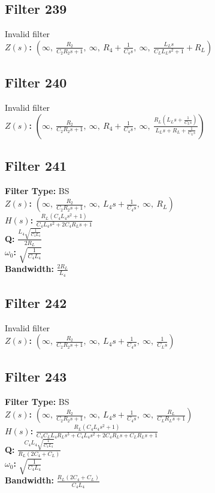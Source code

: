 \documentclass{article}
\begin{document}
\subsection*{Filter 239}
Invalid filter \\ 
\textbf{$Z(s)$:} $\left( \infty, \  \frac{R_{2}}{C_{2} R_{2} s + 1}, \  \infty, \  R_{4} + \frac{1}{C_{4} s}, \  \infty, \  \frac{L_{L} s}{C_{L} L_{L} s^{2} + 1} + R_{L}\right)$ \\ 
\subsection*{Filter 240}
Invalid filter \\ 
\textbf{$Z(s)$:} $\left( \infty, \  \frac{R_{2}}{C_{2} R_{2} s + 1}, \  \infty, \  R_{4} + \frac{1}{C_{4} s}, \  \infty, \  \frac{R_{L} \left(L_{L} s + \frac{1}{C_{L} s}\right)}{L_{L} s + R_{L} + \frac{1}{C_{L} s}}\right)$ \\ 
\subsection*{Filter 241}
\textbf{Filter Type:} BS \\ 
\textbf{$Z(s)$:} $\left( \infty, \  \frac{R_{2}}{C_{2} R_{2} s + 1}, \  \infty, \  L_{4} s + \frac{1}{C_{4} s}, \  \infty, \  R_{L}\right)$ \\ 
\textbf{$H(s)$:} $\frac{R_{L} \left(C_{4} L_{4} s^{2} + 1\right)}{C_{4} L_{4} s^{2} + 2 C_{4} R_{L} s + 1}$ \\ 
\textbf{Q:} $\frac{L_{4} \sqrt{\frac{1}{C_{4} L_{4}}}}{2 R_{L}}$ \\ 
\textbf{$\omega_0$:} $\sqrt{\frac{1}{C_{4} L_{4}}}$ \\ 
\textbf{Bandwidth:} $\frac{2 R_{L}}{L_{4}}$ \\ 
\subsection*{Filter 242}
Invalid filter \\ 
\textbf{$Z(s)$:} $\left( \infty, \  \frac{R_{2}}{C_{2} R_{2} s + 1}, \  \infty, \  L_{4} s + \frac{1}{C_{4} s}, \  \infty, \  \frac{1}{C_{L} s}\right)$ \\ 
\subsection*{Filter 243}
\textbf{Filter Type:} BS \\ 
\textbf{$Z(s)$:} $\left( \infty, \  \frac{R_{2}}{C_{2} R_{2} s + 1}, \  \infty, \  L_{4} s + \frac{1}{C_{4} s}, \  \infty, \  \frac{R_{L}}{C_{L} R_{L} s + 1}\right)$ \\ 
\textbf{$H(s)$:} $\frac{R_{L} \left(C_{4} L_{4} s^{2} + 1\right)}{C_{4} C_{L} L_{4} R_{L} s^{3} + C_{4} L_{4} s^{2} + 2 C_{4} R_{L} s + C_{L} R_{L} s + 1}$ \\ 
\textbf{Q:} $\frac{C_{4} L_{4} \sqrt{\frac{1}{C_{4} L_{4}}}}{R_{L} \left(2 C_{4} + C_{L}\right)}$ \\ 
\textbf{$\omega_0$:} $\sqrt{\frac{1}{C_{4} L_{4}}}$ \\ 
\textbf{Bandwidth:} $\frac{R_{L} \left(2 C_{4} + C_{L}\right)}{C_{4} L_{4}}$ \\ 
\end{document}
